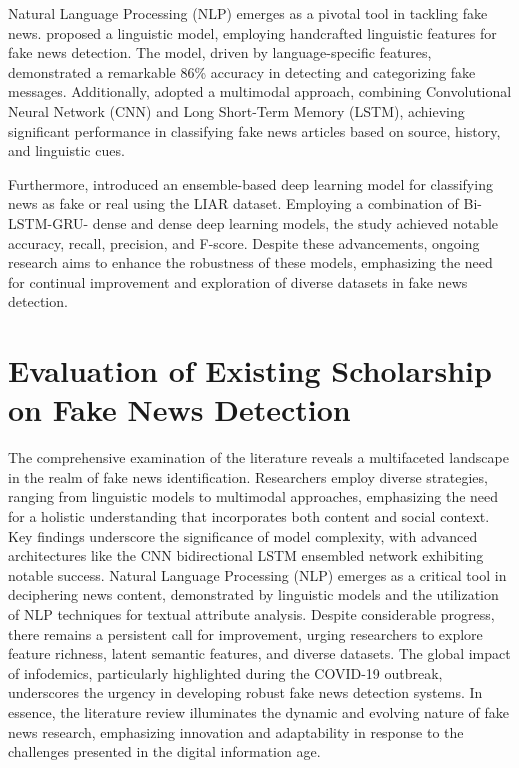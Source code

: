 Natural Language Processing (NLP) emerges as a pivotal tool in tackling fake news. 
\cite{choudhary2021linguistic} proposed a linguistic model, employing handcrafted linguistic 
features for fake news detection. The model, driven by language-specific features, demonstrated 
a remarkable 86\% accuracy in detecting and categorizing fake messages. Additionally, 
\cite{abdullah2020fake} adopted a multimodal approach, combining Convolutional Neural Network 
(CNN) and Long Short-Term Memory (LSTM), achieving significant performance in classifying fake 
news articles based on source, history, and linguistic cues.

Furthermore, \cite{aslam2021fake} introduced an ensemble-based deep learning model for 
classifying news as fake or real using the LIAR dataset. Employing a combination of Bi-LSTM-GRU-
dense and dense deep learning models, the study achieved notable accuracy, recall, precision, 
and F-score. Despite these advancements, ongoing research aims to enhance the robustness of 
these models, emphasizing the need for continual improvement and exploration of diverse 
datasets in fake news detection.



\section{Evaluation of Existing Scholarship on Fake News Detection } %
The comprehensive examination of the literature reveals a multifaceted landscape in the realm 
of fake news identification. Researchers employ diverse strategies, ranging from linguistic 
models to multimodal approaches, emphasizing the need for a holistic understanding that 
incorporates both content and social context. Key findings underscore the significance of model 
complexity, with advanced architectures like the CNN bidirectional LSTM ensembled network 
exhibiting notable success. Natural Language Processing (NLP) emerges as a critical tool in 
deciphering news content, demonstrated by linguistic models and the utilization of NLP 
techniques for textual attribute analysis. Despite considerable progress, there remains a 
persistent call for improvement, urging researchers to explore feature richness, latent 
semantic features, and diverse datasets. The global impact of infodemics, particularly 
highlighted during the COVID-19 outbreak, underscores the urgency in developing robust fake 
news detection systems. In essence, the literature review illuminates the dynamic and evolving 
nature of fake news research, emphasizing innovation and adaptability in response to the 
challenges presented in the digital information age.
\\

